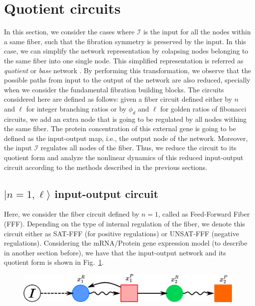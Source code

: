 \section{Quotient circuits}
\label{sec:quotient}

In this section, we consider the cases where  $\mathcal{I}$
is the input for all the nodes within a same fiber, such that 
the fibration symmetry is preserved by the input. In this case, 
we can simplify the network representation by colapsing nodes 
belonging to the same fiber into one single node. This simplified
representation is referred as {\it quotient} or {\it base} network 
\cite{martin_ian_groupoids2006,Boldi2002,morone2020}. By performing this 
transformation, we observe that the possible paths from input to
the output of the network are also reduced, specially when we 
consider the fundamental fibration building blocks. The circuits 
considered here are defined as follows: given a fiber circuit
defined either by $n$ and $\ell$ for integer branching ratios or 
by $\phi_d$ and $\ell$ for golden ratios of fibonacci circuits, we 
add an extra node that is going to be regulated by all nodes 
withing the same fiber. The protein concentration of this external
gene is going to be defined as the input-output map, i.e., the 
output node of the network. Moreover, the input $\mathcal{I}$ 
regulates all nodes of the fiber. Thus, we reduce the circuit to 
its quotient form and analyze the nonlinear dynamics of this 
reduced input-output circuit according to the methods described in 
the previous sections.

\subsection{$|n = 1, \ell \rangle$ input-output circuit}

Here, we consider the fiber circuit defined by $n = 1$, called 
as Feed-Forward Fiber (FFF)\cite{transistor2019}. Depending 
on the type of internal regulation of the fiber, we denote this 
circuit either as SAT-FFF (for positive regulations) or UNSAT-FFF
(negative regulations). Considering the mRNA/Protein gene 
expression model (to describe in another section before), we have
that the input-output network and its quotient form is shown in 
Fig.~\ref{fig:n1_quot}.

\begin{figure}[H]
    \centering
    \includegraphics[scale=0.5]{figs/quotient_n1.png}
    \caption{}
    \label{fig:n1_quot}
\end{figure}

